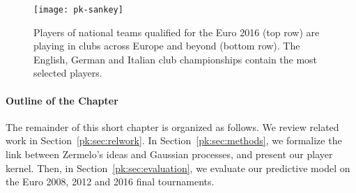 \begin{figure}
  \centering
  \texttt{[image: pk-sankey]}
  \caption{
  Players of national teams qualified for the Euro 2016 (top row) are playing in clubs across Europe and beyond (bottom row).
  The English, German and Italian club championships contain the most selected players.
}
  \label{pk:fig:sankey}
\end{figure}

\paragraph{Outline of the Chapter}
The remainder of this short chapter is organized as follows.
We review related work in Section~\ref{pk:sec:relwork}.
In Section~\ref{pk:sec:methods}, we formalize the link between Zermelo's ideas and Gaussian processes, and present our player kernel.
Then, in Section~\ref{pk:sec:evaluation}, we evaluate our predictive model on the Euro 2008, 2012 and 2016 final tournaments.
